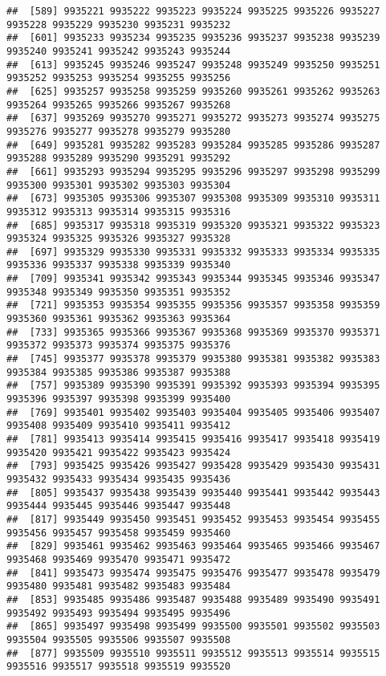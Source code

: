 \documentclass[
]{article}
\begin{document}
\begin{verbatim}
##  [589] 9935221 9935222 9935223 9935224 9935225 9935226 9935227 9935228 9935229 9935230 9935231 9935232
##  [601] 9935233 9935234 9935235 9935236 9935237 9935238 9935239 9935240 9935241 9935242 9935243 9935244
##  [613] 9935245 9935246 9935247 9935248 9935249 9935250 9935251 9935252 9935253 9935254 9935255 9935256
##  [625] 9935257 9935258 9935259 9935260 9935261 9935262 9935263 9935264 9935265 9935266 9935267 9935268
##  [637] 9935269 9935270 9935271 9935272 9935273 9935274 9935275 9935276 9935277 9935278 9935279 9935280
##  [649] 9935281 9935282 9935283 9935284 9935285 9935286 9935287 9935288 9935289 9935290 9935291 9935292
##  [661] 9935293 9935294 9935295 9935296 9935297 9935298 9935299 9935300 9935301 9935302 9935303 9935304
##  [673] 9935305 9935306 9935307 9935308 9935309 9935310 9935311 9935312 9935313 9935314 9935315 9935316
##  [685] 9935317 9935318 9935319 9935320 9935321 9935322 9935323 9935324 9935325 9935326 9935327 9935328
##  [697] 9935329 9935330 9935331 9935332 9935333 9935334 9935335 9935336 9935337 9935338 9935339 9935340
##  [709] 9935341 9935342 9935343 9935344 9935345 9935346 9935347 9935348 9935349 9935350 9935351 9935352
##  [721] 9935353 9935354 9935355 9935356 9935357 9935358 9935359 9935360 9935361 9935362 9935363 9935364
##  [733] 9935365 9935366 9935367 9935368 9935369 9935370 9935371 9935372 9935373 9935374 9935375 9935376
##  [745] 9935377 9935378 9935379 9935380 9935381 9935382 9935383 9935384 9935385 9935386 9935387 9935388
##  [757] 9935389 9935390 9935391 9935392 9935393 9935394 9935395 9935396 9935397 9935398 9935399 9935400
##  [769] 9935401 9935402 9935403 9935404 9935405 9935406 9935407 9935408 9935409 9935410 9935411 9935412
##  [781] 9935413 9935414 9935415 9935416 9935417 9935418 9935419 9935420 9935421 9935422 9935423 9935424
##  [793] 9935425 9935426 9935427 9935428 9935429 9935430 9935431 9935432 9935433 9935434 9935435 9935436
##  [805] 9935437 9935438 9935439 9935440 9935441 9935442 9935443 9935444 9935445 9935446 9935447 9935448
##  [817] 9935449 9935450 9935451 9935452 9935453 9935454 9935455 9935456 9935457 9935458 9935459 9935460
##  [829] 9935461 9935462 9935463 9935464 9935465 9935466 9935467 9935468 9935469 9935470 9935471 9935472
##  [841] 9935473 9935474 9935475 9935476 9935477 9935478 9935479 9935480 9935481 9935482 9935483 9935484
##  [853] 9935485 9935486 9935487 9935488 9935489 9935490 9935491 9935492 9935493 9935494 9935495 9935496
##  [865] 9935497 9935498 9935499 9935500 9935501 9935502 9935503 9935504 9935505 9935506 9935507 9935508
##  [877] 9935509 9935510 9935511 9935512 9935513 9935514 9935515 9935516 9935517 9935518 9935519 9935520

\end{verbatim}
\end{document}
